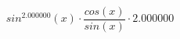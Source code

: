 \documentclass{article}
\begin{document}
$$sin^{2.000000}(x) \cdot \frac{cos(x)}{sin(x)} \cdot 2.000000$$
\end{document}
